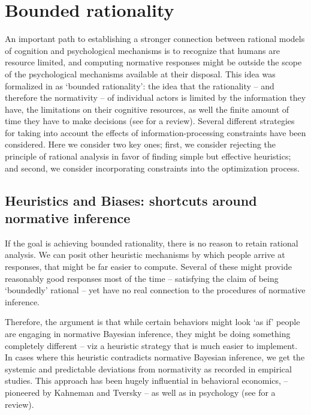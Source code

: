 \section{Bounded rationality}
\label{sec:psych_BR}

An important path to establishing a stronger connection between rational models of cognition and psychological mechanisms is to recognize that humans are resource limited, and computing normative responses might be outside the scope of the psychological mechanisms available at their disposal. This idea was formalized in \citet{simon1955behavioral} as `bounded rationality': the idea that the rationality -- and therefore the normativity -- of individual actors is limited by the information they have, the limitations on their cognitive resources, as well the finite amount of time they have to make decisions (see \citet{russell2016rationality} for a review). Several different strategies for taking into account the effects of information-processing constraints have been considered. Here we consider two key ones; first, we consider rejecting the principle of rational analysis in favor of finding simple but effective heuristics; and second, we consider incorporating constraints into the optimization process.

\subsection{Heuristics and Biases: shortcuts around normative inference}

If the goal is achieving bounded rationality, there is no reason to retain rational analysis. We can posit other heuristic mechanisms by which people arrive at responses, that might be far easier to compute. Several of these might provide reasonably good responses most of the time -- satisfying the claim of being `boundedly' rational -- yet have no real connection to the procedures of normative inference. 

Therefore, the argument is that while certain behaviors might look `as if' people are engaging in normative Bayesian inference, they might be doing something completely different -- viz a heuristic strategy that is much easier to implement. In cases where this heuristic contradicts normative Bayesian inference, we get the systemic and predictable deviations from normativity as recorded in empirical studies. This approach has been hugely influential in behavioral economics, -- pioneered by Kahneman and Tversky\cite{tversky} -- as well as in psychology (see \citet{gigerenzer2002bounded} for a review). 

